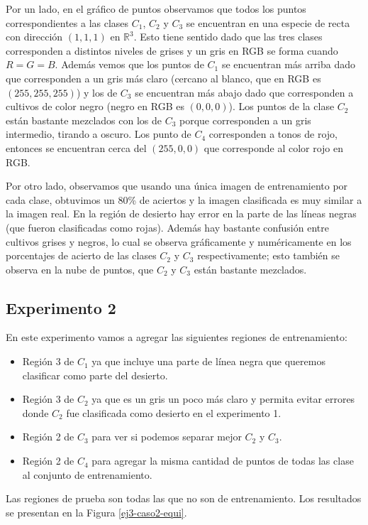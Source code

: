 \documentclass[a4paper,11pt]{article}
\newcommand{\real}{\mathds{R}}
\begin{document}
Por un lado, en el gráfico de puntos observamos que todos los puntos correspondientes a las clases $C_1$, $C_2$ y $C_3$ se encuentran en una especie de recta con dirección $(1,1,1)$ en $\real^3$. Esto tiene sentido dado que las tres clases corresponden a distintos niveles de grises y un gris en RGB se forma cuando $R=G=B$. Además vemos que los puntos de $C_1$ se encuentran más arriba dado que corresponden a un gris más claro (cercano al blanco, que en RGB es $(255,255,255)$) y los de $C_3$ se encuentran más abajo dado que corresponden a cultivos de color negro (negro en RGB es $(0,0,0)$). Los puntos de la clase $C_2$ están bastante mezclados con los de $C_3$ porque corresponden a un gris intermedio, tirando a oscuro. Los punto de $C_4$ corresponden a tonos de rojo, entonces se encuentran cerca del $(255,0,0)$ que corresponde al color rojo en RGB.

Por otro lado, observamos que usando una única imagen de entrenamiento por cada clase, obtuvimos un 80\% de aciertos y la imagen clasificada es muy similar a la imagen real. En la región de desierto hay error en la parte de las líneas negras (que fueron clasificadas como rojas). Además hay bastante confusión entre cultivos grises y negros, lo cual se observa gráficamente y numéricamente en los porcentajes de acierto de las clases $C_2$ y $C_3$ respectivamente; esto también se observa en la nube de puntos, que $C_2$ y $C_3$ están bastante mezclados.



\subsection{Experimento 2}
En este experimento vamos a agregar las siguientes regiones de entrenamiento:
\begin{itemize}
  \item Región 3 de $C_1$ ya que incluye una parte de línea negra que queremos clasificar como parte del desierto.
  \item Región 3 de $C_2$ ya que es un gris un poco más claro y permita evitar errores donde $C_2$ fue clasificada como desierto en el experimento 1.
  \item Región 2 de $C_3$ para ver si podemos separar mejor $C_2$ y $C_3$.
  \item Región 2 de $C_4$ para agregar la misma cantidad de puntos de todas las clase al conjunto de entrenamiento.
\end{itemize}
Las regiones de prueba son todas las que no son de entrenamiento. Los resultados se presentan en la Figura \ref{ej3-caso2-equi}. %
\end{document}
